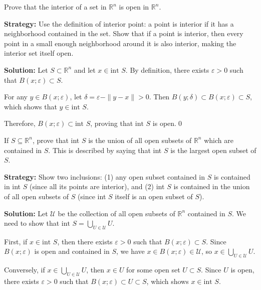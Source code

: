 \begin{problembox}
Prove that the interior of a set in $\mathbb{R}^n$ is open in $\mathbb{R}^n$.
\end{problembox}

\noindent\textbf{Strategy:} Use the definition of interior point: a point is interior if it has a neighborhood contained in the set. Show that if a point is interior, then every point in a small enough neighborhood around it is also interior, making the interior set itself open.

\bigskip\noindent\textbf{Solution:} Let $S \subset \mathbb{R}^n$ and let $x \in \text{int } S$. By definition, there exists $\varepsilon > 0$ such that $B(x;\varepsilon) \subset S$.

For any $y \in B(x;\varepsilon)$, let $\delta = \varepsilon - \|y-x\| > 0$. Then $B(y;\delta) \subset B(x;\varepsilon) \subset S$, which shows that $y \in \text{int } S$.

Therefore, $B(x;\varepsilon) \subset \text{int } S$, proving that $\text{int } S$ is open.\qed


\begin{problembox}
If $S \subseteq \mathbb{R}^n$, prove that int $S$ is the union of all open subsets of $\mathbb{R}^n$ which are contained in $S$. This is described by saying that int $S$ is the largest open subset of $S$.
\end{problembox}

\noindent\textbf{Strategy:} Show two inclusions: (1) any open subset contained in $S$ is contained in int $S$ (since all its points are interior), and (2) int $S$ is contained in the union of all open subsets of $S$ (since int $S$ itself is an open subset of $S$).

\bigskip\noindent\textbf{Solution:} Let $\mathcal{U}$ be the collection of all open subsets of $\mathbb{R}^n$ contained in $S$. We need to show that $\text{int } S = \bigcup_{U \in \mathcal{U}} U$.

First, if $x \in \text{int } S$, then there exists $\varepsilon > 0$ such that $B(x;\varepsilon) \subset S$. Since $B(x;\varepsilon)$ is open and contained in $S$, we have $x \in B(x;\varepsilon) \in \mathcal{U}$, so $x \in \bigcup_{U \in \mathcal{U}} U$.

Conversely, if $x \in \bigcup_{U \in \mathcal{U}} U$, then $x \in U$ for some open set $U \subset S$. Since $U$ is open, there exists $\varepsilon > 0$ such that $B(x;\varepsilon) \subset U \subset S$, which shows $x \in \text{int } S$.

